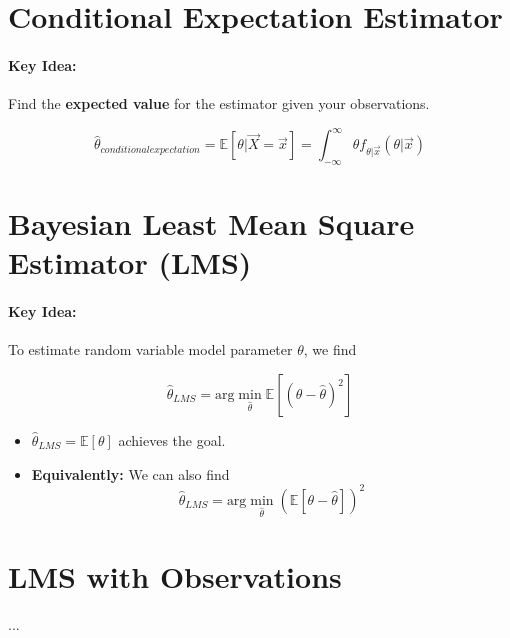 \documentclass[a4paper,12pt]{report}
\begin{document}
\section{Conditional Expectation Estimator}

\paragraph{Key Idea: } Find the \textbf{expected value} for the estimator given your observations.

\begin{equation}
\hat\theta_{conditional expectation} = \mathbb E[\theta | \vec X = \vec x] = \int_{-\infty}^\infty \theta f_{\theta|\vec x}(\theta | \vec x)
\end{equation}


\section{Bayesian Least Mean Square Estimator (LMS)}

\paragraph{Key Idea: } To estimate random variable model parameter $\theta$, we find

\begin{equation}
\hat \theta_{LMS} = \text{arg}\min_{\hat \theta} \mathbb E [(\theta-\hat\theta)^2]
\end{equation}

\begin{itemize}
\item $\hat \theta_{LMS} = \mathbb E[\theta]$ achieves the goal.
\item \textbf{Equivalently: } We can also find 
\begin{equation}
\hat\theta_{LMS} = \text{arg}\min_{\hat \theta} (\mathbb E[\theta-\hat\theta])^2
\end{equation}
\end{itemize}

\section{LMS with Observations}

...
\end{document}
